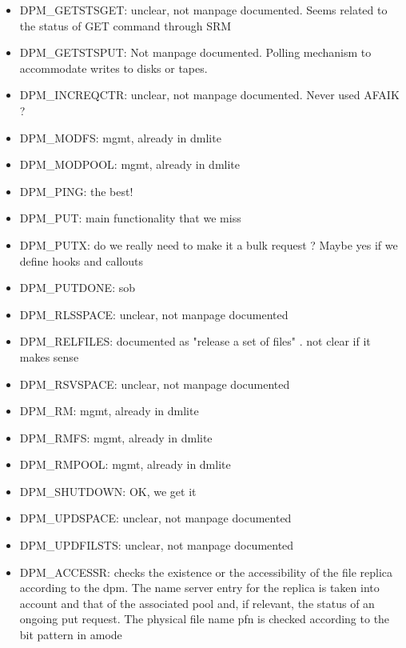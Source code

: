 \documentclass[a4paper,10pt]{scrreprt}
\begin{document}
\begin{itemize}
\item DPM\_GETSTSGET: unclear, not manpage documented. Seems related to the status of GET command through SRM

\item DPM\_GETSTSPUT: Not manpage documented. Polling mechanism to accommodate writes to disks or tapes.

\item DPM\_INCREQCTR: unclear, not manpage documented. Never used AFAIK ?

\item DPM\_MODFS: mgmt, already in dmlite

\item DPM\_MODPOOL: mgmt, already in dmlite

\item DPM\_PING: the best!

\item DPM\_PUT: main functionality that we miss
\item DPM\_PUTX: do we really need to make it a bulk request ? Maybe yes if we define hooks and callouts

\item DPM\_PUTDONE: sob

\item DPM\_RLSSPACE: unclear, not manpage documented

\item DPM\_RELFILES: documented as "release a set of files" . not clear if it makes sense

\item DPM\_RSVSPACE: unclear, not manpage documented

\item DPM\_RM: mgmt, already in dmlite

\item DPM\_RMFS: mgmt, already in dmlite

\item DPM\_RMPOOL: mgmt, already in dmlite

\item DPM\_SHUTDOWN: OK, we get it

\item DPM\_UPDSPACE: unclear, not manpage documented

\item DPM\_UPDFILSTS: unclear, not manpage documented

\item DPM\_ACCESSR: checks the existence  or  the  accessibility  of  the  file
       replica  according to the dpm. The name server entry for the replica is
       taken into account and that of the associated pool  and,  if  relevant,
       the  status  of  an ongoing put request.  The physical file name pfn is
       checked according to the bit pattern in amode

\end{itemize}
\end{document}
